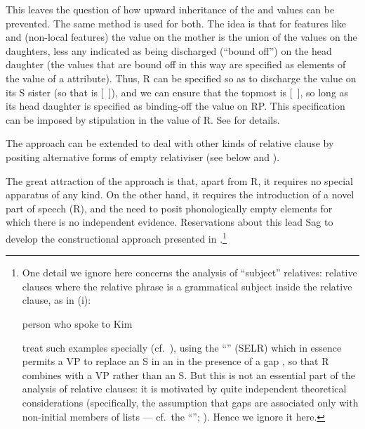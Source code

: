\documentclass[output=paper
                ,modfonts
                ,nonflat
	        ,collection
	        ,collectionchapter
	        ,collectiontoclongg
 	        ,biblatex
                ,babelshorthands
                ,newtxmath
                ,draftmode
                ,colorlinks, citecolor=brown
]{./langsci/langscibook}
\begin{document}
This leaves the question of how upward inheritance of the  and 
values can be prevented. The same method is used for both. The idea is that for features
like  and  (non-local features) the value on the mother is the
union of the values on the daughters, less any indicated as being discharged
(``bound off'') on the head daughter (the values that are bound off in this way are
specified as elements of the value of a  attribute). Thus, R can be specified so as to discharge the
 value on its S sister (so that  is [~\setof{}]), and we can
ensure that the topmost  is [~\setof{}], so long as its head  daughter is specified as
binding-off the  value on RP. This specification can be imposed by stipulation
in the  value of R.  See \cite[164]{Pollard:Sag:94} for details.

The approach can be extended to deal with other kinds of relative clause by positing
alternative forms of empty relativiser (see below and \citealt[Chapter~5]{Pollard:Sag:94}).

The great attraction of the approach is that, apart from R, it requires no special
apparatus of any kind. On the other hand, it requires the introduction of a novel part
of speech (R), and the need to posit phonologically empty elements for which there is no
independent evidence. Reservations about this lead Sag to develop the constructional
approach presented in \cite{Sag:97}.\footnote{\label{fn:rc-1}%
One detail we ignore here concerns the analysis of ``subject'' relatives: relative clauses where
the relative phrase is a grammatical subject inside the relative clause, as in (i):
\begin{exe}
  \ex\label{x:rc-40} person who spoke to Kim 
\end{exe}
\cite{Pollard:Sag:94} treat such examples specially (cf.\
\citealt[218--219]{Pollard:Sag:94}), using the ``'' (SELR)
which in essence permits a VP to replace an S in an \feat{arg-st} in the presence of a
gap \citep[174]{Pollard:Sag:94}, so that R combines with a VP rather than an S. But this
is not an essential part of the analysis of relative clauses: it is motivated by quite
independent theoretical considerations (specifically, the assumption that gaps are
associated only with non-initial members of \feat{arg-st} lists --- cf.\ the
``\isi{Trace-Principle}''; \citealt[172]{Pollard:Sag:94}). Hence we ignore it here.}
\end{document}
